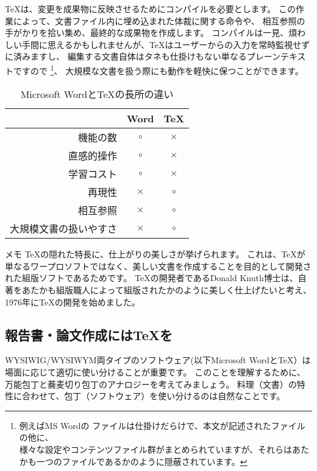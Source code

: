 \documentclass[TeXworkshop]{subfiles}
\begin{document}
\TeX は、変更を成果物に反映させるためにコンパイルを必要とします。
この作業によって、文書ファイル内に埋め込まれた体裁に関する命令や、
相互参照の手がかりを拾い集め、最終的な成果物を作成します。
コンパイルは一見、煩わしい手間に思えるかもしれませんが、\TeX はユーザーからの入力を常時監視せずに済みますし、
編集する文書自体はタネも仕掛けもない単なるプレーンテキストですので
\footnote{例えばMS Wordの ファイルは仕掛けだらけで、本文が記述されたファイルの他に、\\
様々な設定やコンテンツファイル群がまとめられていますが、それらはあたかも一つのファイルであるかのように隠蔽されています。}、
大規模な文書を扱う際にも動作を軽快に保つことができます。

\begin{table}[h]
  \begin{center}
  \caption{Microsoft Wordと\TeX の長所の違い}
  \label{table:differences}
  \begin{tabular}{rcc}
                & Word & \TeX \\\hline
    機能の数              & $\circ$ & $\times$\\
    直感的操作            & $\circ$ & $\times$\\
    学習コスト            & $\circ$ & $\times$\\
    再現性                & $\times$ & $\circ$ \\
    相互参照              & $\times$ & $\circ$ \\
    大規模文書の扱いやすさ& $\times$ & $\circ$ \\\hline
  \end{tabular}
  \end{center}
\end{table}

\begin{itembox}[l]{メモ}
\TeX の隠れた特長に、仕上がりの美しさが挙げられます。
  これは、\TeX が単なるワープロソフトではなく、美しい文書を作成することを目的として開発された組版ソフトであるためです。
  \TeX の開発者であるDonald Knuth博士は、自著をあたかも組版職人によって組版されたかのように美しく仕上げたいと考え、1976年に\TeX の開発を始めました。
\end{itembox}

\subsection{報告書・論文作成には\TeX を}
WYSIWIG/WYSIWYM両タイプのソフトウェア(以下Microsoft Wordと\TeX）は場面に応じて適切に使い分けることが重要です。
このことを理解するために、万能包丁と蕎麦切り包丁のアナロジーを考えてみましょう。
料理（文書）の特性に合わせて、包丁（ソフトウェア）を使い分けるのは自然なことです。
\end{document}
